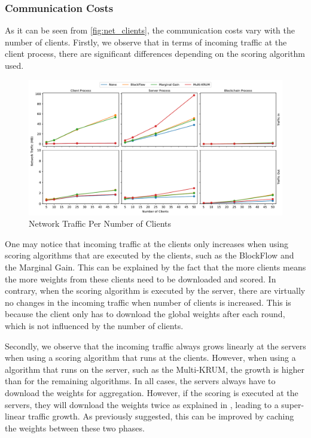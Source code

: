 \subsubsection{Communication Costs}

As it can be seen from \autoref{fig:net_clients}, the communication costs vary with the number of clients. Firstly, we observe that in terms of incoming traffic at the client process, there are significant differences depending on the scoring algorithm used.

\begin{figure}[!hb]
    \centering
    \includegraphics[width=\textwidth]{graphics/clients/traffic.pdf}
    \caption{Network Traffic Per Number of Clients}
    \label{fig:net_clients}
\end{figure}

One may notice that incoming traffic at the clients only increases when using scoring algorithms that are executed by the clients, such as the BlockFlow and the Marginal Gain. This can be explained by the fact that the more clients means the more weights from these clients need to be downloaded and scored. In contrary, when the scoring algorithm is executed by the server, there are virtually no changes in the incoming traffic when number of clients is increased. This is because the client only has to download the global weights after each round, which is not influenced by the number of clients.

Secondly, we observe that the incoming traffic always grows linearly at the servers when using a scoring algorithm that runs at the clients. However, when using a algorithm that runs on the server, such as the Multi-KRUM, the growth is higher than for the remaining algorithms. In all cases, the servers always have to download the weights for aggregation. However, if the scoring is executed at the servers, they will download the weights twice as explained in , leading to a super-linear traffic growth. As previously suggested, this can be improved by caching the weights between these two phases.

